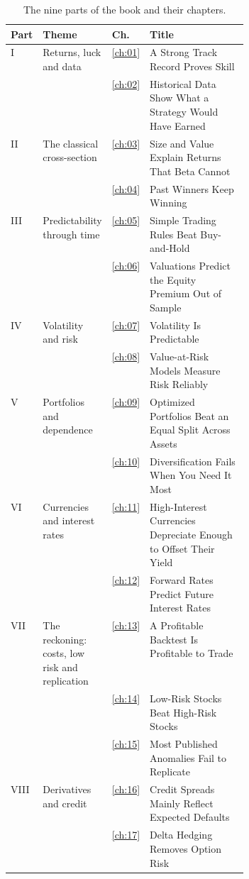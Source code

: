 \begin{table}[htbp]
\centering
\small
\caption{The nine parts of the book and their chapters.}
\label{tab:pref-parts}
\begin{tabularx}{0.95\linewidth}{@{}>{\raggedright\arraybackslash}p{0.07\linewidth}>{\raggedright\arraybackslash}p{0.28\linewidth}>{\raggedleft\arraybackslash}p{0.04\linewidth}>{\raggedright\arraybackslash}X@{}}
\toprule
Part & Theme & Ch. & Title \\
\midrule
I & Returns, luck and data & \ref{ch:01} & A Strong Track Record Proves Skill \\
 &  & \ref{ch:02} & Historical Data Show What a Strategy Would Have Earned \\
\addlinespace
II & The classical cross-section & \ref{ch:03} & Size and Value Explain Returns That Beta Cannot \\
 &  & \ref{ch:04} & Past Winners Keep Winning \\
\addlinespace
III & Predictability through time & \ref{ch:05} & Simple Trading Rules Beat Buy-and-Hold \\
 &  & \ref{ch:06} & Valuations Predict the Equity Premium Out of Sample \\
\addlinespace
IV & Volatility and risk & \ref{ch:07} & Volatility Is Predictable \\
 &  & \ref{ch:08} & Value-at-Risk Models Measure Risk Reliably \\
\addlinespace
V & Portfolios and dependence & \ref{ch:09} & Optimized Portfolios Beat an Equal Split Across Assets \\
 &  & \ref{ch:10} & Diversification Fails When You Need It Most \\
\addlinespace
VI & Currencies and interest rates & \ref{ch:11} & High-Interest Currencies Depreciate Enough to Offset Their Yield \\
 &  & \ref{ch:12} & Forward Rates Predict Future Interest Rates \\
\addlinespace
VII & The reckoning: costs, low risk and replication & \ref{ch:13} & A Profitable Backtest Is Profitable to Trade \\
 &  & \ref{ch:14} & Low-Risk Stocks Beat High-Risk Stocks \\
 &  & \ref{ch:15} & Most Published Anomalies Fail to Replicate \\
\addlinespace
VIII & Derivatives and credit & \ref{ch:16} & Credit Spreads Mainly Reflect Expected Defaults \\
 &  & \ref{ch:17} & Delta Hedging Removes Option Risk \\

\end{tabularx}
\end{table}
